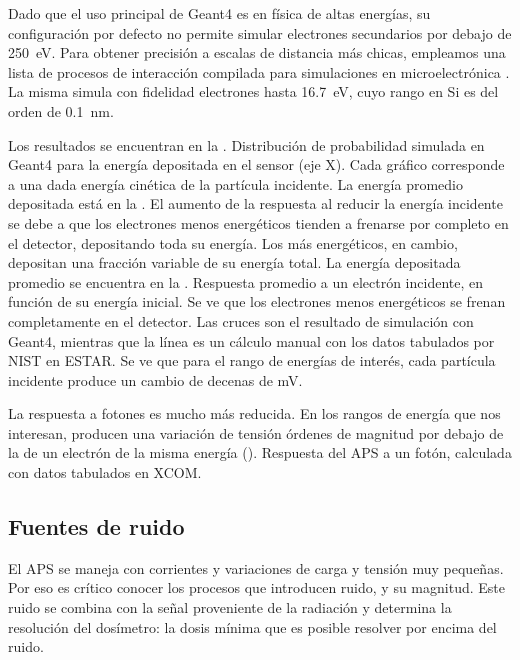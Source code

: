 Dado que el uso principal de Geant4 es en física de altas energías,
su configuración por defecto no permite simular electrones secundarios por
debajo de \SI{250}{\electronvolt}.
Para obtener precisión a escalas de distancia más chicas,
empleamos una lista de procesos de interacción 
compilada para simulaciones en microelectrónica \cite{Raine201497}.
La misma simula con fidelidad electrones hasta \SI{16.7}{\electronvolt},
cuyo rango en Si es del orden de \SI{0.1}{\nano\meter}.

Los resultados se encuentran en la .
{Distribución de probabilidad simulada en Geant4 
    para la energía depositada en el sensor (eje X).
Cada gráfico corresponde a una dada energía cinética de la partícula incidente.
La energía promedio depositada está en la .}
El aumento de la respuesta al reducir la energía incidente se debe a que 
los electrones menos energéticos 
tienden a frenarse por completo en el detector,
depositando toda su energía.
Los más energéticos, en cambio, depositan una fracción variable de su energía
total.
La energía depositada promedio se encuentra en la
.
{Respuesta promedio a un electrón incidente,
en función de su energía inicial.
Se ve que los electrones menos energéticos se frenan completamente en el
detector.
Las cruces son el resultado de simulación con Geant4,
mientras que la línea es un cálculo manual 
con los datos tabulados por NIST en ESTAR\cite{berger_estar_????}.}
Se ve que para el rango de energías de interés,
cada partícula incidente produce un cambio de decenas de mV.

La respuesta a fotones es mucho más reducida. 
En los rangos de energía que nos interesan, producen una variación de tensión órdenes de magnitud por debajo de la de un electrón de la misma energía ().
{Respuesta del APS a un fotón, calculada con datos tabulados en XCOM\cite{suplee_xcom_2009}.}
\subsection{Fuentes de ruido}
El APS se maneja con corrientes y variaciones de carga y tensión muy
pequeñas.
Por eso es crítico conocer los procesos que introducen ruido, 
y su magnitud.
Este ruido se combina con la señal proveniente de la radiación
y determina la resolución del dosímetro: 
la dosis mínima que es posible resolver por encima del
ruido\cite{taylor_introduction_1997}.
